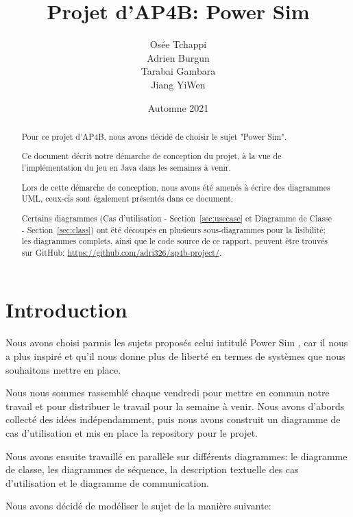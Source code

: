 \documentclass[12pt]{article}
\title{Projet d'AP4B: Power Sim}
\author{
    Osée Tchappi \\
    Adrien Burgun \\
    Tarabai Gambara \\
    Jiang YiWen
}
\date{Automne 2021}
\begin{document}
\maketitle

\begin{abstract}
    Pour ce projet d'AP4B, nous avons décidé de choisir le sujet "Power Sim".

    Ce document décrit notre démarche de conception du projet, à la vue de l'implémentation du jeu en Java dans les semaines à venir.

    Lors de cette démarche de conception, nous avons été amenés à écrire des diagrammes UML, ceux-cis sont également présentés dans ce document.

    Certains diagrammes (Cas d'utilisation - Section~\ref{sec:usecase} et Diagramme de Classe - Section~\ref{sec:class}) ont été découpés en plusieurs sous-diagrammes pour la lisibilité; les diagrammes complets, ainsi que le code source de ce rapport, peuvent être trouvés sur GitHub: \url{https://github.com/adri326/ap4b-project/}.
\end{abstract}

\newpage
\tableofcontents
\newpage

\section{Introduction}

Nous avons choisi parmis les sujets proposés celui intitulé \og Power Sim \fg, car il nous a plus inspiré et qu'il nous donne plus de liberté en termes de systèmes que nous souhaitons mettre en place.

Nous nous sommes rassemblé chaque vendredi pour mettre en commun notre travail et pour distribuer le travail pour la semaine à venir.
Nous avons d'abords collecté des idées indépendamment, puis nous avons construit un diagramme de cas d'utilisation et mis en place la repository pour le projet.

Nous avons ensuite travaillé en parallèle sur différents diagrammes: le diagramme de classe, les diagrammes de séquence, la description textuelle des cas d'utilisation et le diagramme de communication.

Nous avons décidé de modéliser le sujet de la manière suivante:
\end{document}

